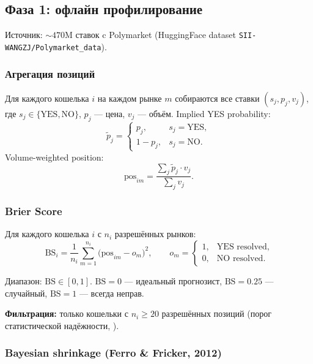 \documentclass[a4paper, 11pt]{article}
\newcommand{\bs}{\mathrm{BS}}
\begin{document}
\subsection{Фаза 1: офлайн профилирование}

Источник: ${\sim}470$M ставок c Polymarket (HuggingFace dataset \texttt{SII-WANGZJ/Polymarket\_data}).

\subsubsection{Агрегация позиций}

Для каждого кошелька $i$ на каждом рынке $m$ собираются все ставки
$(s_j, p_j, v_j)$, где $s_j \in \{\text{YES}, \text{NO}\}$,
$p_j$ --- цена, $v_j$ --- объём.
Implied YES probability:
\[
\tilde{p}_j = \begin{cases} p_j, & s_j = \text{YES}, \\ 1 - p_j, & s_j = \text{NO}. \end{cases}
\]
Volume-weighted position:
\begin{equation}
\label{eq:position}
\mathrm{pos}_{im} = \frac{\sum_j \tilde{p}_j \cdot v_j}{\sum_j v_j}.
\end{equation}

\subsubsection{Brier Score}

Для каждого кошелька $i$ с $n_i$ разрешённых рынков:
\begin{equation}
\label{eq:brier}
\bs_i = \frac{1}{n_i} \sum_{m=1}^{n_i} \bigl(\mathrm{pos}_{im} - o_m\bigr)^2, \qquad
o_m = \begin{cases} 1, & \text{YES resolved}, \\ 0, & \text{NO resolved}. \end{cases}
\end{equation}

Диапазон: $\bs \in [0, 1]$.
$\bs = 0$ --- идеальный прогнозист, $\bs = 0.25$ --- случайный, $\bs = 1$ --- всегда неправ.

\textbf{Фильтрация:} только кошельки с $n_i \geq 20$ разрешённых позиций (порог статистической надёжности, \citealt{satopaa2014combining}).

\subsubsection{Bayesian shrinkage (Ferro \& Fricker, 2012)}
\label{sec:shrinkage_bs}
\end{document}
